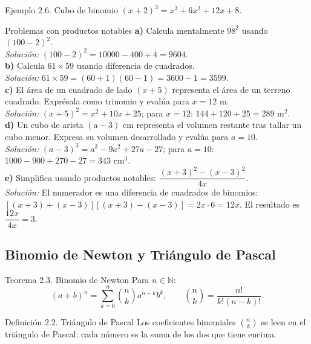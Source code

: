 \documentclass[12pt,letterpaper]{book}
\begin{document}
\begin{ejbox}{Ejemplo 2.6. Cubo de binomio}
$(x+2)^3=x^3+6x^2+12x+8$.
\end{ejbox}

\begin{aplbox}{Problemas con productos notables}
\textbf{a)} Calcula mentalmente $98^2$ usando $(100-2)^2$.\\
\textit{Solución:} $(100-2)^2=10000-400+4=9604$.\\[4pt]
\textbf{b)} Calcula $61\times59$ usando diferencia de cuadrados.\\
\textit{Solución:} $61\times59=(60+1)(60-1)=3600-1=3599$.\\[4pt]
\textbf{c)} El área de un cuadrado de lado $(x+5)$ representa el área de un terreno cuadrado. Exprésala como trinomio y evalúa para $x=12$ m.\\
\textit{Solución:} $(x+5)^2=x^2+10x+25$; para $x=12$: $144+120+25=289$ m$^2$.\\[4pt]
\textbf{d)} Un cubo de arista $(a-3)$ cm representa el volumen restante tras tallar un cubo menor. Expresa su volumen desarrollado y evalúa para $a=10$.\\
\textit{Solución:} $(a-3)^3=a^3-9a^2+27a-27$; para $a=10$: $1000-900+270-27=343$ cm$^3$.\\[4pt]
\textbf{e)} Simplifica usando productos notables: $\dfrac{(x+3)^2-(x-3)^2}{4x}$.\\
\textit{Solución:} El numerador es una diferencia de cuadrados de binomios: $[(x+3)+(x-3)][(x+3)-(x-3)]=2x\cdot6=12x$. El resultado es $\dfrac{12x}{4x}=3$.
\end{aplbox}

\subsection{Binomio de Newton y Triángulo de Pascal}

\begin{thmbox}{Teorema 2.3. Binomio de Newton}
Para $n\in\mathbb{N}$:
\[ (a+b)^n=\sum_{k=0}^{n}\binom{n}{k}a^{n-k}b^k,\qquad \binom{n}{k}=\frac{n!}{k!(n-k)!}. \]
\end{thmbox}

\begin{defbox}{Definición 2.2. Triángulo de Pascal}
Los coeficientes binomiales $\binom{n}{k}$ se leen en el triángulo de Pascal: cada número es la suma de los dos que tiene encima.
\end{defbox}
\end{document}

